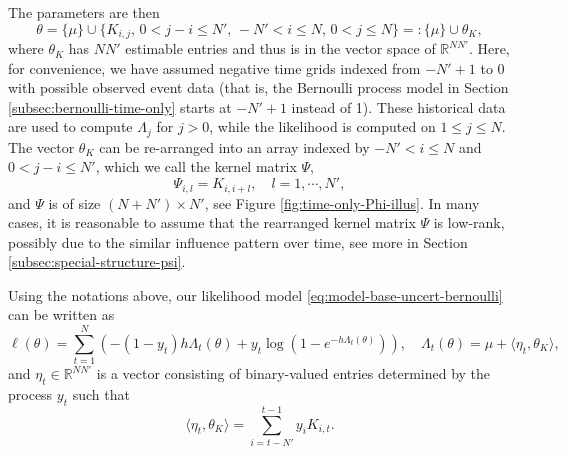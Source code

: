 \documentclass[11pt]{article}
\theoremstyle{remark}
\theoremstyle{plain}
\newcommand{\R}{\mathbb{R}}
\begin{document}
The parameters are then
\begin{equation}\label{eq:def-theta-timeonly-Omega}
    \theta 
    = \{ \mu \} \cup
    \{ K_{i,j}, \,  0 <j-i \le N', \,  -N' < i \le N, \, 0 < j  \le N \}
    =: \{ \mu \} \cup \theta_K, 
\end{equation} 
where $\theta_K$ has $N N'$ estimable entries and thus is in the vector space of $\R^{NN'}$. 
Here, for convenience, we have assumed negative time grids indexed from $-N'+1$ to 0 with possible observed event data (that is, the Bernoulli process model in Section \ref{subsec:bernoulli-time-only} starts at $-N'+1$ instead of 1). 
These historical data are used to compute $\Lambda_j$ for $j >0$, while the likelihood is computed on $1 \le j \le N$.  
%
The vector $\theta_K$ can be re-arranged into an array indexed by $ -N' < i \le N$  and $0 < j-i \le N'$, 
which we call the kernel matrix $\Psi $,
\begin{equation}\label{eq:def-Psi-matrix}
\Psi_{i,l} = K_{i, i+l}, \quad l=1, \cdots, N',
\end{equation}
 and $\Psi$ is of size $(N+N')\times N'$, see Figure \ref{fig:time-only-Phi-illus}.
 In many cases, it is reasonable to assume that the rearranged kernel matrix $\Psi$ is low-rank, possibly due to the similar influence pattern over time, see more in Section \ref{subsec:special-structure-psi}. 

Using the notations above, our likelihood model \eqref{eq:model-base-uncert-bernoulli} can be written as
\begin{equation*}
\ell(\theta)
= \sum_{t=1}^N \left( 
- (1-y_t ) h \Lambda_t(\theta) +  y_t  \log ( 1 - e^{ - h \Lambda_t(\theta)} )
\right), 
\quad 
\Lambda_t ( \theta ) = \mu + \langle \eta_t , \theta_K \rangle,
\end{equation*}
and  $\eta_t \in \R^{NN'}$ is a vector 
consisting of binary-valued entries determined by the process $y_t$ such that 
\begin{equation}\label{eq:def-innerprod-etat-K}
\langle \eta_t , \theta_K \rangle = \sum_{ i = t- N' }^{t-1}  y_i  K_{i, t}.
\end{equation}
\end{document}
